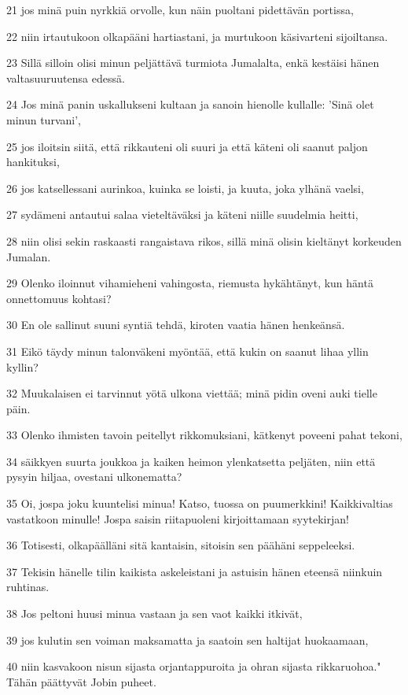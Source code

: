 \par 21 jos minä puin nyrkkiä orvolle, kun näin puoltani pidettävän portissa,
\par 22 niin irtautukoon olkapääni hartiastani, ja murtukoon käsivarteni sijoiltansa.
\par 23 Sillä silloin olisi minun peljättävä turmiota Jumalalta, enkä kestäisi hänen valtasuuruutensa edessä.
\par 24 Jos minä panin uskallukseni kultaan ja sanoin hienolle kullalle: 'Sinä olet minun turvani',
\par 25 jos iloitsin siitä, että rikkauteni oli suuri ja että käteni oli saanut paljon hankituksi,
\par 26 jos katsellessani aurinkoa, kuinka se loisti, ja kuuta, joka ylhänä vaelsi,
\par 27 sydämeni antautui salaa vieteltäväksi ja käteni niille suudelmia heitti,
\par 28 niin olisi sekin raskaasti rangaistava rikos, sillä minä olisin kieltänyt korkeuden Jumalan.
\par 29 Olenko iloinnut vihamieheni vahingosta, riemusta hykähtänyt, kun häntä onnettomuus kohtasi?
\par 30 En ole sallinut suuni syntiä tehdä, kiroten vaatia hänen henkeänsä.
\par 31 Eikö täydy minun talonväkeni myöntää, että kukin on saanut lihaa yllin kyllin?
\par 32 Muukalaisen ei tarvinnut yötä ulkona viettää; minä pidin oveni auki tielle päin.
\par 33 Olenko ihmisten tavoin peitellyt rikkomuksiani, kätkenyt poveeni pahat tekoni,
\par 34 säikkyen suurta joukkoa ja kaiken heimon ylenkatsetta peljäten, niin että pysyin hiljaa, ovestani ulkonematta?
\par 35 Oi, jospa joku kuuntelisi minua! Katso, tuossa on puumerkkini! Kaikkivaltias vastatkoon minulle! Jospa saisin riitapuoleni kirjoittamaan syytekirjan!
\par 36 Totisesti, olkapäälläni sitä kantaisin, sitoisin sen päähäni seppeleeksi.
\par 37 Tekisin hänelle tilin kaikista askeleistani ja astuisin hänen eteensä niinkuin ruhtinas.
\par 38 Jos peltoni huusi minua vastaan ja sen vaot kaikki itkivät,
\par 39 jos kulutin sen voiman maksamatta ja saatoin sen haltijat huokaamaan,
\par 40 niin kasvakoon nisun sijasta orjantappuroita ja ohran sijasta rikkaruohoa." Tähän päättyvät Jobin puheet.

